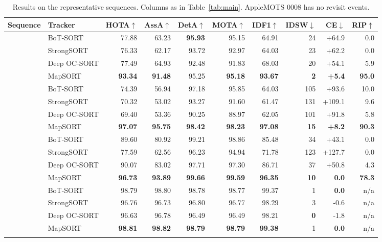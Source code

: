 \documentclass[pdflatex,sn-basic]{sn-jnl}%
\theoremstyle{thmstyleone}%
\begin{document}
\begin{table}[t]
\caption{Results on the representative sequences. Columns as in Table~\ref{tab:main}. AppleMOTS 0008 has no revisit events.}\label{tab:seq}
\footnotesize
\setlength{\tabcolsep}{3.5pt}
\begin{tabular*}{\textwidth}{@{\extracolsep\fill}llrrrrrrrr@{}}
\toprule
Sequence & Tracker & HOTA$\uparrow$ & AssA$\uparrow$ & DetA$\uparrow$ & MOTA$\uparrow$ & IDF1$\uparrow$ & IDSW$\downarrow$ & CE$\downarrow$ & RIP$\uparrow$ \\
\midrule
{} & BoT-SORT & 77.88 & 63.23 & \textbf{95.93} & 95.15 & 64.91 & 24 & +64.9 & 0.0 \\
 & StrongSORT & 76.33 & 62.17 & 93.72 & 92.97 & 64.03 & 23 & +62.2 & 0.0 \\
 & Deep OC-SORT & 77.49 & 64.93 & 92.48 & 91.83 & 68.03 & 20 & +54.1 & 5.9 \\
 & MapSORT & \textbf{93.34} & \textbf{91.48} & 95.25 & \textbf{95.18} & \textbf{93.67} & \textbf{2} & \textbf{+5.4} & \textbf{95.0} \\
\midrule
{} & BoT-SORT & 74.39 & 56.94 & 97.18 & 95.85 & 64.03 & 105 & +93.6 & 10.0 \\
 & StrongSORT & 70.32 & 53.02 & 93.27 & 91.60 & 61.47 & 131 & +109.1 & 9.6 \\
 & Deep OC-SORT & 69.40 & 53.36 & 90.25 & 88.97 & 62.05 & 101 & +91.8 & 5.8 \\
 & MapSORT & \textbf{97.07} & \textbf{95.75} & \textbf{98.42} & \textbf{98.23} & \textbf{97.08} & \textbf{15} & \textbf{+8.2} & \textbf{90.3} \\
\midrule
{} & BoT-SORT & 89.60 & 80.92 & 99.21 & 98.86 & 85.48 & 34 & +43.1 & 0.0 \\
 & StrongSORT & 77.59 & 62.56 & 96.23 & 94.94 & 71.78 & 123 & +127.7 & 0.0 \\
 & Deep OC-SORT & 90.07 & 83.02 & 97.71 & 97.30 & 86.71 & 37 & +50.8 & 4.3 \\
 & MapSORT & \textbf{96.73} & \textbf{93.89} & \textbf{99.66} & \textbf{99.59} & \textbf{96.35} & \textbf{10} & \textbf{0.0} & \textbf{78.3} \\
\midrule
{} & BoT-SORT & 98.79 & 98.80 & 98.78 & 98.77 & 99.37 & 1 & \textbf{0.0} & n/a \\
 & StrongSORT & 96.76 & 96.73 & 96.80 & 96.77 & 98.29 & 3 & -0.6 & n/a \\
 & Deep OC-SORT & 96.63 & 96.78 & 96.49 & 96.49 & 98.21 & \textbf{0} & -1.8 & n/a \\
 & MapSORT & \textbf{98.81} & \textbf{98.82} & \textbf{98.79} & \textbf{98.79} & \textbf{99.38} & 1 & \textbf{0.0} & n/a \\
\botrule
\end{tabular*}
\end{table}
\end{document}
